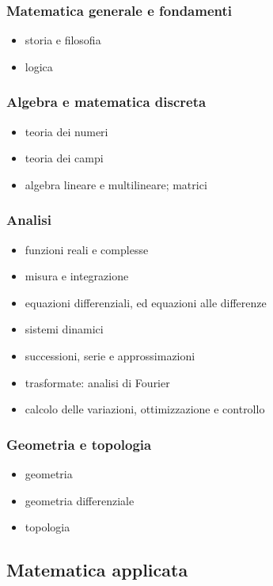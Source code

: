 \subsubsection{Matematica generale e fondamenti}
\begin{itemize}
    \item storia e filosofia
    \item logica
\end{itemize}
\subsubsection{Algebra e matematica discreta}
\begin{itemize}
    \item teoria dei numeri
    \item teoria dei campi
    \item algebra lineare e multilineare; matrici
\end{itemize}

\subsubsection{Analisi}
\begin{itemize}
    \item funzioni reali e complesse
    \item misura e integrazione
    \item equazioni differenziali, ed equazioni alle differenze
    \item sistemi dinamici
    \item successioni, serie e approssimazioni
    \item trasformate: analisi di Fourier
    \item calcolo delle variazioni, ottimizzazione e controllo
\end{itemize}

\subsubsection{Geometria e topologia}
\begin{itemize}
    \item geometria
    \item geometria differenziale
    \item topologia
\end{itemize}

\subsection{Matematica applicata}
